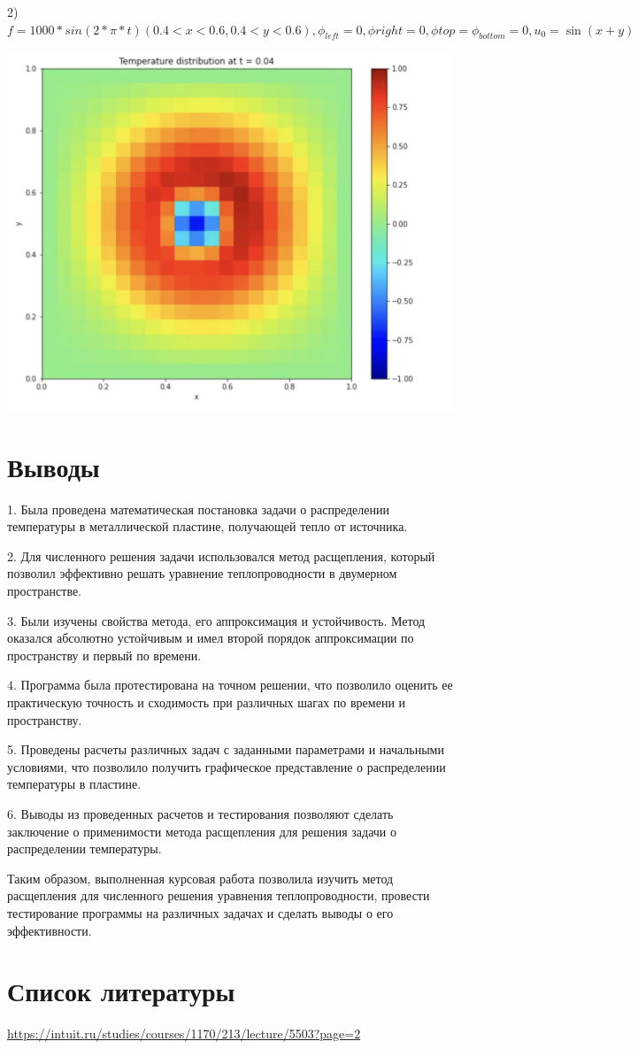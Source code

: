 \documentclass[a4paper]{article}
\begin{document}
2) $f = 1000 * sin(2 * \pi * t) (0.4 < x < 0.6, 0.4 < y < 0.6), \phi_{left} = 0, \phi{right} = 0, \phi{top} = \phi_{bottom} = 0, u_0 = \sin{(x + y)}$

\begin{center}
	\includegraphics[width=500pt]{dymanic.png}
\end{center}

\section{Выводы}

1. Была проведена математическая постановка задачи о распределении температуры в металлической пластине, получающей тепло от источника.

2. Для численного решения задачи использовался метод расщепления, который позволил эффективно решать уравнение теплопроводности в двумерном пространстве.

3. Были изучены свойства метода, его аппроксимация и устойчивость. Метод оказался абсолютно устойчивым и имел второй порядок аппроксимации по пространству и первый по времени.

4. Программа была протестирована на точном решении, что позволило оценить ее практическую точность и сходимость при различных шагах по времени и пространству.

5. Проведены расчеты различных задач с заданными параметрами и начальными условиями, что позволило получить графическое представление о распределении температуры в пластине.

6. Выводы из проведенных расчетов и тестирования позволяют сделать заключение о применимости метода расщепления для решения задачи о распределении температуры.

Таким образом, выполненная курсовая работа позволила изучить метод расщепления для численного решения уравнения теплопроводности, провести тестирование программы на различных задачах и сделать выводы о его эффективности.

\section{Список литературы}

\url{https://intuit.ru/studies/courses/1170/213/lecture/5503?page=2}
\end{document}
